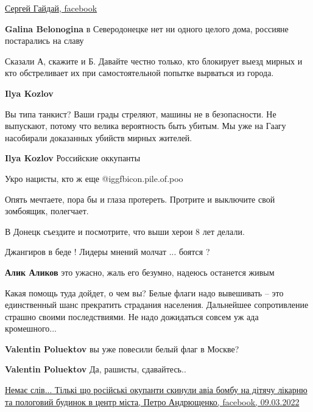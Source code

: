 \begin{itemize}
\begin{itemize}
\href{https://www.facebook.com/profile.php?id=100000695401534}{%
Сергей Гайдай, facebook}

\textbf{Galina Belonogina} в Северодонецке нет ни одного целого дома, россияне постарались на славу

\end{itemize} %


Сказали А, скажите и Б. Давайте честно только, кто блокирует выезд мирных и кто
обстреливает их при самостоятельной попытке вырваться из города.

\begin{itemize} %
\textbf{Ilya Kozlov} 

Вы типа танкист? Ваши грады стреляют, машины не в безопасности. Не выпускают,
потому что велика вероятность быть убитым. Мы уже на Гаагу насобирали
доказанных убийств мирных жителей.

\textbf{Ilya Kozlov} Российские оккупанты

Укро нацисты, кто ж еще @igg{fbicon.pile.of.poo} 

Опять мечтаете, пора бы и глаза протереть. Протрите и выключите свой зомбоящик, полегчает.

В Донецк съездите и посмотрите, что выши херои 8 лет делали.
\end{itemize} %

Джангиров в беде ! Лидеры мнений молчат ... боятся ?

\textbf{Алик Аликов} это ужасно, жаль его безумно, надеюсь останется живым


Какая помощь туда дойдет, о чем вы? Белые флаги надо вывешивать – это
единственный шанс прекратить страдания населения. Дальнейшее сопротивление
страшно своими последствиями. Не надо дожидаться совсем уж ада кромешного...

\begin{itemize} %
\textbf{Valentin Poluektov} вы уже повесили белый флаг в Москве?

\textbf{Valentin Poluektov} Да, рашисты, сдавайтесь..
\end{itemize} %


\href{https://m.facebook.com/story.php?story_fbid=502400268069394&id=100048982762482}{%
Немає слів... Тількі що російські окупанти скинули авіа бомбу на дітячу лікарню та пологовий будинок в центр міста, %
Петро Андрющенко, facebook, 09.03.2022%
}


\end{itemize}
